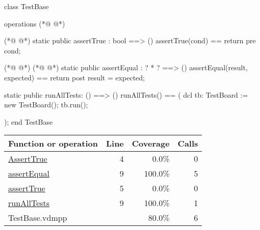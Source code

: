 \begin{vdmpp}[breaklines=true]
class TestBase

operations
(*@
\label{AssertTrue:4}
@*)
 
(*@
\label{assertTrue:5}
@*)
 static public assertTrue : bool ==> ()
  assertTrue(cond) == return
 pre cond;
  
(*@
\label{assertEqual:9}
@*)
(*@
\label{runAllTests:9}
@*)
 static public assertEqual : ? * ? ==> ()
  assertEqual(result, expected) == return
 post result = expected;
  
 static public runAllTests: () ==> ()
  runAllTests() == (
    dcl tb: TestBoard := new TestBoard();
    tb.run();
    
    );
end TestBase
\end{vdmpp}
\bigskip
\begin{longtable}{|l|r|r|r|}
\hline
Function or operation & Line & Coverage & Calls \\
\hline
\hline
\hyperref[AssertTrue:4]{AssertTrue} & 4&0.0\% & 0 \\
\hline
\hyperref[assertEqual:9]{assertEqual} & 9&100.0\% & 5 \\
\hline
\hyperref[assertTrue:5]{assertTrue} & 5&0.0\% & 0 \\
\hline
\hyperref[runAllTests:9]{runAllTests} & 9&100.0\% & 1 \\
\hline
\hline
TestBase.vdmpp & & 80.0\% & 6 \\
\hline
\end{longtable}

